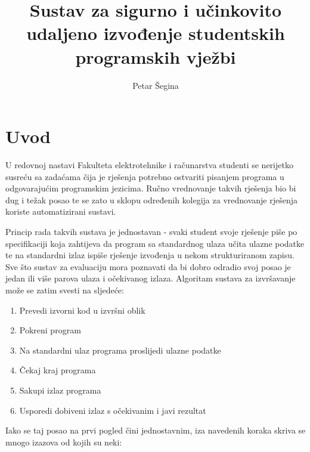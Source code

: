 \documentclass[times, utf8, zavrsni]{fer}
\begin{document}

\title{Sustav za sigurno i učinkovito udaljeno izvođenje studentskih programskih vježbi}

\author{Petar Šegina}

\maketitle



\zahvala{}

\tableofcontents

\chapter{Uvod}

U redovnoj nastavi Fakulteta elektrotehnike i računarstva studenti se nerijetko susreću sa zadaćama čija je rješenja potrebno ostvariti pisanjem programa u odgovarajućim programskim jezicima. Ručno vrednovanje takvih rješenja bio bi dug i težak posao te se zato u sklopu određenih kolegija za vrednovanje rješenja koriste automatizirani sustavi.

Princip rada takvih sustava je jednostavan - svaki student svoje rješenje piše po specifikaciji koja zahtijeva da program sa standardnog ulaza učita ulazne podatke te na standardni izlaz ispiše rješenje izvođenja u nekom strukturiranom zapisu. Sve što sustav za evaluaciju mora poznavati da bi dobro odradio svoj posao je jedan ili više parova ulaza i očekivanog izlaza. Algoritam sustava za izvršavanje može se zatim svesti na sljedeće:

\begin{enumerate}
\item Prevedi izvorni kod u izvršni oblik
\item Pokreni program
\item Na standardni ulaz programa proslijedi ulazne podatke
\item Čekaj kraj programa
\item Sakupi izlaz programa
\item Usporedi dobiveni izlaz s očekivanim i javi rezultat
\end{enumerate}

Iako se taj posao na prvi pogled čini jednostavnim, iza navedenih koraka skriva se mnogo izazova od kojih su neki:
\end{document}
